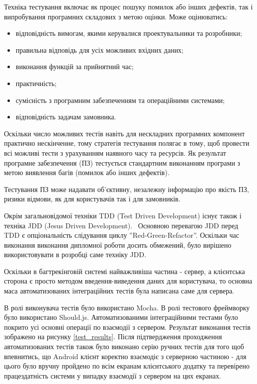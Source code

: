 \documentclass[../main.tex]{subfiles}
\begin{document}
	Техніка тестування включає як процес пошуку помилок або інших дефектів, так і випробування програмних складових з метою оцінки. Може оцінюватись:
	\begin{itemize}
		\item відповідність вимогам, якими керувалися проектувальники та розробники;
		\item правильна відповідь для усіх можливих вхідних даних;
		\item виконання функцій за прийнятний час;
		\item практичність;
		\item сумісність з програмним забезпеченням та операційними системами;
		\item відповідність задачам замовника.
	\end{itemize}
	
	Оскільки число можливих тестів навіть для нескладних програмних компонент практично нескінченне, тому стратегія тестування полягає в тому, щоб провести всі можливі тести з урахуванням наявного часу та ресурсів. Як результат програмне забезпечення (ПЗ) тестується стандартним виконанням програми з метою виявлення багів (помилок або інших дефектів).~\cite{software_testing}
	
	Тестування ПЗ може надавати об'єктивну, незалежну інформацію про якість ПЗ, ризики відмови, як для користувачів так і для замовників.~\cite{agile_testing}
	
	Окрім загальновідомої техніки TDD (Test Driven Development) існує також і техніка JDD (Jesus Driven Development).~\cite{jdd} Основною перевагою JDD перед TDD є опціональність слідування циклу ''Red-Green-Refactor''. Оскільки час виконання виконання дипломної роботи досить обмежений, було вирішено використовувати в розробці саме техніку JDD.
	
	Оскільки в багтрекінговій системі найважливіша частина - сервер, а клієнтська сторона є просто методом введення-виведення даних для користувача, то основна маса автоматизованих інтеграційних тестів була написана саме для сервера.
	
	В ролі виконувача тестів було використано Mocha. В ролі тестового фреймворку було використано Should.js. Автоматизованими інтеграційними тестами було покрито усі основні операції по взаємодії з сервером. Результат виконання тестів зображено на рисунку \ref{test_results}. Після підтвердження проходження автоматизованих тестів також було виконано серію ручних тестів для того щоб впевнитись, що Android клієнт коректно взаємодіє з серверною частиною - для цього було вручну пройдено по всім екранам клієнтського додатку та перевірено працездатність системи у випадку взаємодії з сервером на цих екранах.
	
\end{document}

